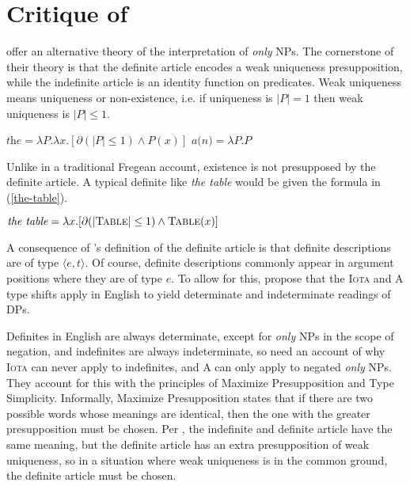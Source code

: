 \section{Critique of \citet{cb2015}\label{sec:coppock-beaver}}
\citet{cb2015} offer an alternative theory of the interpretation of \textit{only} NPs. The cornerstone of their theory is that the definite article encodes a weak uniqueness presupposition, while the indefinite article is an identity function on predicates. Weak uniqueness means uniqueness or non-existence, i.e. if uniqueness is $|P| = 1$ then weak uniqueness is $|P| \le 1$.

\begin{exe}
	\ex $\textit{the} = \lambda P . \lambda x . [\partial(|P| \le 1) \land P(x)]$
	\ex $\textit{a(n)} = \lambda P . P$
\end{exe}

Unlike in a traditional Fregean account, existence is not presupposed by the definite article. A typical definite like \textit{the table} would be given the formula in (\ref{the-table}).

\begin{exe}
	\ex \label{the-table} $\textit{the table} = \lambda x . [ \partial(|\textsc{Table}| \le 1) \land \textsc{Table}(x) ]$
\end{exe}

A consequence of \citeauthor{cb2015}'s definition of the definite article is that definite descriptions are of type $\langle e, t \rangle$. Of course, definite descriptions commonly appear in argument positions where they are of type $e$. To allow for this, \citeauthor{cb2015} propose that the \textsc{Iota} and \textsc{A} type shifts apply in English to yield determinate and indeterminate readings of DPs.


Definites in English are always determinate, except for \textit{only} NPs in the scope of negation, and indefinites are always indeterminate, so \citeauthor{cb2015} need an account of why \textsc{Iota} can never apply to indefinites, and \textsc{A} can only apply to negated \textit{only} NPs. They account for this with the principles of Maximize Presupposition and Type Simplicity. Informally, Maximize Presupposition states that if there are two possible words whose meanings are identical, then the one with the greater presupposition must be chosen. Per \citeauthor{cb2015}, the indefinite and definite article have the same meaning, but the definite article has an extra presupposition of weak uniqueness, so in a situation where weak uniqueness is in the common ground, the definite article must be chosen.

